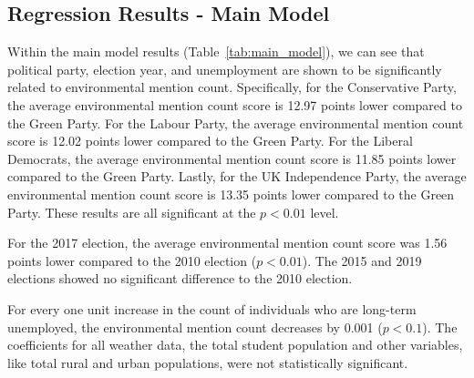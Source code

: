 \documentclass[12pt,letterpaper]{article}
\renewcommand{\headrulewidth}{0pt} %
\begin{document}
\subsection{Regression Results - Main Model}


Within the main model results (Table~\ref{tab:main_model}), we can see that political party, election year, and unemployment are shown to be significantly related to environmental mention count. Specifically, for the Conservative Party, the average environmental mention count score is 12.97 points lower compared to the Green Party. For the Labour Party, the average environmental mention count score is 12.02 points lower compared to the Green Party. For the Liberal Democrats, the average environmental mention count score is 11.85 points lower compared to the Green Party. Lastly, for the UK Independence Party, the average environmental mention count score is 13.35 points lower compared to the Green Party. These results are all significant at the $p<0.01$ level.

For the 2017 election, the average environmental mention count score was 1.56 points lower compared to the 2010 election ($p<0.01$). The 2015 and 2019 elections showed no significant difference to the 2010 election. 

For every one unit increase in the count of individuals who are long-term unemployed, the environmental mention count decreases by 0.001 ($p<0.1$). The coefficients for all weather data, the total student population and other variables, like total rural and urban populations, were not statistically significant.


\newpage

\fancypagestyle{special}{%
	\fancyhf{} %
	\renewcommand{\headrulewidth}{0pt} %
	\renewcommand{\footrulewidth}{0pt} %
	\fancyfoot[R]{\thepage} %
}

\thispagestyle{special}
\end{document}
